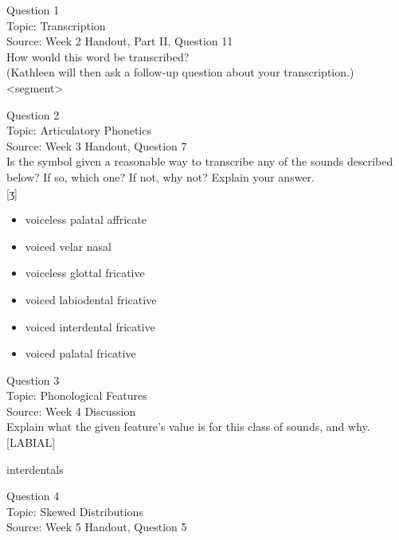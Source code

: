 \documentclass[12pt]{article}
\begin{document}
{\large Question 1}\\

Topic: Transcription\\
Source: Week 2 Handout, Part II, Question 11\\

How would this word be transcribed?\\ (Kathleen will then ask a follow-up question about your transcription.)\\

<segment>


\newpage

{\large Question 2}\\

Topic: Articulatory Phonetics\\
Source: Week 3 Handout, Question 7\\

Is the symbol given a reasonable way to transcribe any of the sounds described below? If so, which one? If not, why not? Explain your answer.\\

{[ʒ]}

\begin{itemize} \item voiceless palatal affricate \item voiced velar nasal \item voiceless glottal fricative \item voiced labiodental fricative \item voiced interdental fricative \item voiced palatal fricative \end{itemize}


\newpage

{\large Question 3}\\

Topic: Phonological Features\\
Source: Week 4 Discussion\\

Explain what the given feature’s value is for this class of sounds, and why.\\

{[LABIAL]}

interdentals


\newpage

{\large Question 4}\\

Topic: Skewed Distributions\\
Source: Week 5 Handout, Question 5\\
\end{document}

